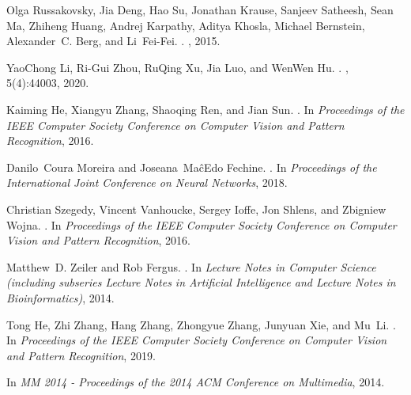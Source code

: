 \documentclass[12pt]{article}
\begin{document}
\begin{thebibliography}{100}
Olga Russakovsky, Jia Deng, Hao Su, Jonathan Krause, Sanjeev Satheesh, Sean Ma,
  Zhiheng Huang, Andrej Karpathy, Aditya Khosla, Michael Bernstein,
  Alexander~C. Berg, and Li~Fei-Fei.
.
, 2015.

YaoChong Li, Ri-Gui Zhou, RuQing Xu, Jia Luo, and WenWen Hu.
.
, 5(4):44003, 2020.

Kaiming He, Xiangyu Zhang, Shaoqing Ren, and Jian Sun.
.
\newblock In {\em Proceedings of the IEEE Computer Society Conference on
  Computer Vision and Pattern Recognition}, 2016.

Danilo~Coura Moreira and Joseana~Ma{\^{c}}Edo Fechine.
.
\newblock In {\em Proceedings of the International Joint Conference on Neural
  Networks}, 2018.

Christian Szegedy, Vincent Vanhoucke, Sergey Ioffe, Jon Shlens, and Zbigniew
  Wojna.
.
\newblock In {\em Proceedings of the IEEE Computer Society Conference on
  Computer Vision and Pattern Recognition}, 2016.

Matthew~D. Zeiler and Rob Fergus.
.
\newblock In {\em Lecture Notes in Computer Science (including subseries
  Lecture Notes in Artificial Intelligence and Lecture Notes in
  Bioinformatics)}, 2014.

Tong He, Zhi Zhang, Hang Zhang, Zhongyue Zhang, Junyuan Xie, and Mu~Li.
.
\newblock In {\em Proceedings of the IEEE Computer Society Conference on
  Computer Vision and Pattern Recognition}, 2019.

\newblock In {\em MM 2014 - Proceedings of the 2014 ACM Conference on
  Multimedia}, 2014.

\end{thebibliography}
\end{document}
